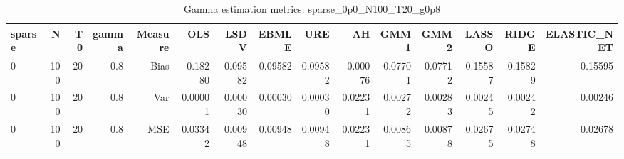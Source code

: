 \begin{table}[!htbp]\centering
\caption{Gamma estimation metrics: sparse_0p0_N100_T20_g0p8}
\label{tab:table1_sparse_0p0_N100_T20_g0p8}
\begin{tabular}{lrrrrrrrrrrrrrr}
\hline
sparse & N & T0 & gamma & Measure & OLS & LSDV & EBMLE & URE & AH & GMM1 & GMM2 & LASSO & RIDGE & ELASTIC_NET \\
\hline
0 & 100 & 20 & 0.8 & Bias & -0.18280 & 0.09582 & 0.09582 & 0.09582 & -0.00076 & 0.07701 & 0.07712 & -0.15587 & -0.15829 & -0.15595 \\
0 & 100 & 20 & 0.8 & Var & 0.00001 & 0.00030 & 0.00030 & 0.00030 & 0.02231 & 0.00272 & 0.00283 & 0.00245 & 0.00242 & 0.00246 \\
0 & 100 & 20 & 0.8 & MSE & 0.03342 & 0.00948 & 0.00948 & 0.00948 & 0.02231 & 0.00865 & 0.00878 & 0.02675 & 0.02748 & 0.02678 \\
\hline
\end{tabular}
\end{table}

